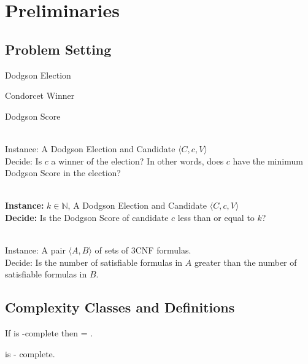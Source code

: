 \section{Preliminaries}

\subsection{Problem Setting}

\begin{defn}{Dodgson Election}

\end{defn}

\begin{defn}{Condorcet Winner}

\end{defn}

\begin{defn}{Dodgson Score}\label{def:dscore}
\end{defn}

\begin{problem}{} \\
    \tab Instance: A Dodgson Election and Candidate $\langle C,c,V \rangle$ \\
    \tab Decide: Is $c$ a winner of the election?
    In other words, does $c$ have the minimum Dodgson Score in the election?

\end{problem}

\begin{problem}{} \\
    \tab \textbf{Instance:} $k \in \mathbb{N}$,
        A Dodgson Election and Candidate $\langle C,c,V \rangle$ \\
    \tab \textbf{Decide:} Is the Dodgson Score of candidate $c$ less than or equal to $k$?
\end{problem}

\begin{problem}{\csat} \citep{compsat}\\
    \tab Instance: A pair $\langle A,B \rangle$ of sets of 3CNF formulas.\\
    \tab Decide: Is the number of satisfiable formulas in $A$
    greater than the number of satisfiable formulas in $B$.
\end{problem}

\subsection{Complexity Classes and Definitions}

\begin{defn}{\tp}

\end{defn}

\begin{corollary}
    If  is \np-complete then  = \np.
\end{corollary}

\begin{theorem} \citep{compsat}
    \csat is \tp- complete.
\end{theorem}



